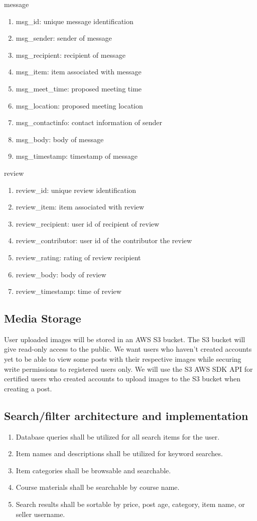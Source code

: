 %
{\large message}
\begin{enumerate}
\item msg\_id: unique message identification
\item msg\_sender: sender of message
\item msg\_recipient: recipient of message
\item msg\_item: item associated with message
\item msg\_meet\_time: proposed meeting time
\item msg\_location: proposed meeting location
\item msg\_contactinfo: contact information of sender
\item msg\_body: body of message
\item msg\_timestamp: timestamp of message
\end{enumerate}%
%
{\large review}
\begin{enumerate}
\item review\_id: unique review identification
\item review\_item: item associated with review
\item review\_recipient: user id of recipient of review
\item review\_contributor: user id of the contributor the review
\item review\_rating: rating of review recipient
\item review\_body: body of review
\item review\_timestamp: time of review
\end{enumerate}%

\subsection{Media Storage}
User uploaded images will be stored in an AWS S3 bucket. The S3 bucket will give read-only access to the public. We want users who haven’t created accounts yet to be able to view some posts with their respective images while securing write permissions to registered users only. We will use the S3 AWS SDK API for certified users who created accounts to upload images to the S3 bucket when creating a post.

\subsection{Search/filter architecture and implementation}
\begin{enumerate}
\item Database queries shall be utilized for all search items for the user.
\item Item names and descriptions shall be utilized for keyword searches.
\item Item categories shall be browsable and searchable.
\item Course materials shall be searchable by course name.
\item Search results shall be sortable by price, post age, category, item name, or seller username.
\end{enumerate}

